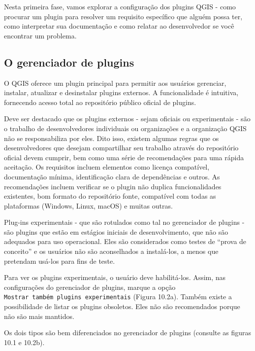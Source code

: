 \documentclass[
]{book}
\begin{document}
Nesta primeira fase, vamos explorar a configuração dos plugins QGIS - como procurar um plugin para resolver um requisito específico que alguém possa ter, como interpretar sua documentação e como relatar ao desenvolvedor se você encontrar um problema.

\hypertarget{o-gerenciador-de-plugins}{%
\subsection{O gerenciador de plugins}\label{o-gerenciador-de-plugins}}

O QGIS oferece um plugin principal para permitir aos usuários gerenciar, instalar, atualizar e desinstalar plugins externos. A funcionalidade é intuitiva, fornecendo acesso total ao repositório público oficial de plugins.

Deve ser destacado que os plugins externos - sejam oficiais ou experimentais - são o trabalho de desenvolvedores individuais ou organizações e a organização QGIS não se responsabiliza por eles. Dito isso, existem algumas regras que os desenvolvedores que desejam compartilhar seu trabalho através do repositório oficial devem cumprir, bem como uma série de recomendações para uma rápida aceitação. Os requisitos incluem elementos como licença compatível, documentação mínima, identificação clara de dependências e outros. As recomendações incluem verificar se o plugin não duplica funcionalidades existentes, bom formato do repositório fonte, compatível com todas as plataformas (Windows, Linux, macOS) e muitas outras.

Plug-ins experimentais - que são rotulados como tal no gerenciador de plugins - são plugins que estão em estágios iniciais de desenvolvimento, que não são adequados para uso operacional. Eles são considerados como testes de ``prova de conceito'' e os usuários não são aconselhados a instalá-los, a menos que pretendam usá-los para fins de teste.

Para ver os plugins experimentais, o usuário deve habilitá-los. Assim, nas configurações do gerenciador de plugins, marque a opção \texttt{Mostrar\ também\ plugins\ experimentais} (Figura 10.2a). Também existe a possibilidade de listar os plugins obsoletos. Eles não são recomendados porque não são mais mantidos.

Os dois tipos são bem diferenciados no gerenciador de plugins (consulte as figuras 10.1 e 10.2b).
\end{document}
